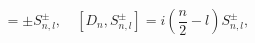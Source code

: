 \begin{equation}
[\Sigma,S^\pm_{n,l}]=\pm S^\pm_{n,l},\quad
[D_n,S^\pm_{n,l}]=i\left(\frac{n}{2}-l\right)
S^\pm_{n,l},
\label{sds}
\end{equation}


